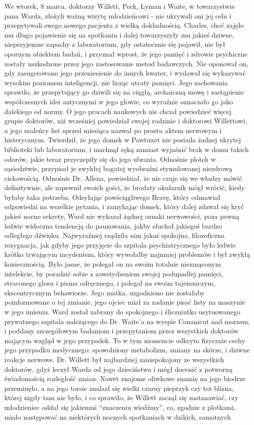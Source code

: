 We wtorek, 8 marca, doktorzy Willett, Peck, Lyman i Waite, w towarzystwie pana Warda, złożyli ważną wizytę młodzieńcowi - nie ukrywali oni jej celu i przepytywali swego nowego pacjenta z wielką dokładnością. Charles, choć zajęło mu długo pojawienie się na spotkaniu i dalej towarzyszyły mu jakieś dziwne, nieprzyjemne zapachy z laboratorium, gdy ostatecznie się pojawił, nie był opornym obiektem badań, i przyznał wprost, że jego pamięć i zdrowie psychiczne zostały uszkodzone przez jego zastosowanie metod badawczych. Nie oponował on, gdy zasugerowano jego przeniesienie do innych kwater, i wydawał się wykazywać wysokim poziomem inteligencji, nie licząc utraty pamięci. Jego zachowania sprawiło, że przepytujący go dziwili się na ciągłą, archaiczną mowę i zastąpienie współczesnych idei antycznymi w jego głowie, co wyraźnie oznaczało go jako dalekiego od normy. O jego pracach naukowych nie chciał powiedzieć więcej grupie doktorów, niż wcześniej powiedział swojej rodzinie i doktorowi Willettowi, a jego szaleńcy list sprzed miesiąca nazwał po prostu aktem nerwowym i histerycznym. Twierdził, że jego domek w Pawtuxet nie posiada żadnej ukrytej biblioteki lub laboratorium, i machnął ręką zamiast wyjaśnić brak w domu takich odorów, jakie teraz przyczepiły się do jego ubrania. Odnośnie plotek w sąsiedztwie, przypisał je zwykłej bogatej wyobraźni stymulowanej niezdrową ciekawością. Odnośnie Dr. Allena, powiedział, że nie czuje się we władzy mówić definitywnie, ale zapewnił swoich gości, że brodaty okularnik mógł wrócić, kiedy byłaby taka potrzeba. Odsyłając powściągliwego Bravę, który odmawiał odpowiedzi na wszelkie pytania, i zamykając domek, który dalej zdawał się kryć jakieś nocne sekrety, Ward nie wykazał żądnej oznaki nerwowości, poza pewną ledwie widoczna tendencją do pauzowania, jakby słuchał jakiegoś bardzo odległego dźwięku. Najwyraźniej rządziła nim jakaś spokojna, filozoficzna rezygnacja, jak gdyby jego przyjęcie do szpitala psychiatrycznego było ledwie krótko trwającym incydentem, który wywołałby najmniej problemów i był zwykłą koniecznością. Było jasne, że polegał on na swoim totalnie niezmąconym intelekcie, by poradzić sobie z zawstydzeniem swojej podupadłej pamięci, straconego głosu i pisma odręcznego, i polegał na swoim tajemniczym, ekscentrycznym behawiorze. Jego matka, uzgodniono nie zostałaby poinformowane o tej zmianie, jego ojciec miał za zadanie pisać listy na maszynie w jego imieniu. Ward został zabrany do spokojnego i śliczniutko usytuowanego prywatnego szpitala należącego do Dr. Waite'a na wyspie Conanicut nad morzem, i poddany szczegółowym badaniom i przepytaniom przez wszystkich doktorów mającym wzgląd w jego przypadek. To w tym momencie odkryto fizycznie cechy jego przypadku medycznego: spowolniony metabolizm, zmiany na skórze, i dziwne reakcje nerwowe. Dr. Willett był najbardziej zaniepokojony ze wszystkich doktorów, gdyż leczył Warda od jego dzieciństwa i mógł docenić z potworną świadomością rozległość zmian. Nawet znajome oliwkowe znamię na jego biodrze przeminęło, a na jego torsie znalazł się wielki czarny pieprzyk czy też blizna, której nigdy tam nie było, i co sprawiło, że Willett zaczął się zastanawiać, czy młodzieniec oddał się jakiemuś ``znaczeniu wiedźmy'', co, zgodnie z plotkami, miało następować na niektórych nocnych spotkaniach w dzikich, samotnych 